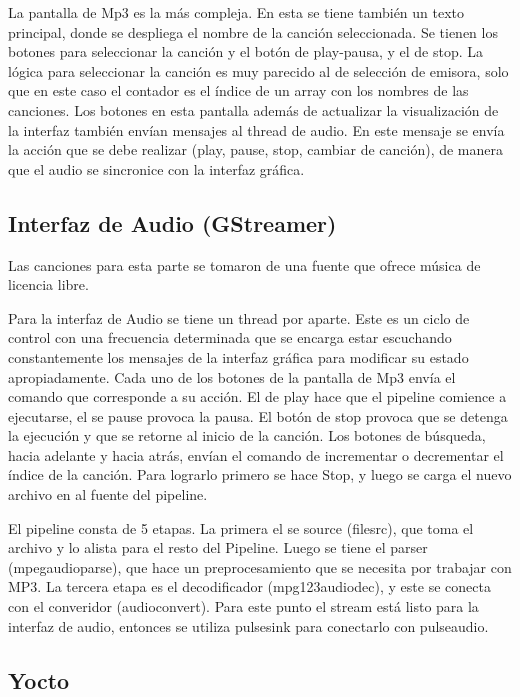La pantalla de Mp3 es la más compleja. En esta se tiene también un texto principal, donde se
despliega el nombre de la canción seleccionada. Se tienen los botones para seleccionar la canción y
el botón de play-pausa, y el de stop. La lógica para seleccionar la canción es muy parecido al de
selección de emisora, solo que en este caso el contador es el índice de un array con los nombres de
las canciones. Los botones en esta pantalla además de actualizar la visualización de la interfaz
también envían mensajes al thread de audio. En este mensaje se envía la acción que se debe realizar
(play, pause, stop, cambiar de canción), de manera que el audio se sincronice con la interfaz
gráfica. 

\subsection{Interfaz de Audio (GStreamer)}
\label{sec:gstramer}
Las canciones para esta parte se tomaron de una fuente que ofrece música de licencia libre. %


Para la interfaz de Audio se tiene un thread por aparte. Este es un ciclo de control con una
frecuencia determinada que se encarga estar escuchando constantemente los mensajes de la interfaz
gráfica para modificar su estado apropiadamente. Cada uno de los botones de la pantalla de Mp3 envía
el comando que corresponde a su acción. El de play hace que el pipeline comience a ejecutarse, el se
pause provoca la pausa. El botón de stop provoca que se detenga la ejecución y que se retorne al
inicio de la canción. Los botones de búsqueda, hacia adelante y hacia atrás, envían el comando de
incrementar o decrementar el índice de la canción. Para lograrlo primero se hace Stop, y luego se
carga el nuevo archivo en al fuente del pipeline. 

El pipeline consta de 5 etapas. La primera el se source (filesrc), que toma el archivo y lo alista
para el resto del Pipeline. Luego se tiene el parser (mpegaudioparse), que hace un preprocesamiento
que se necesita por trabajar con MP3. La tercera etapa es el decodificador (mpg123audiodec), y este
se conecta con el converidor (audioconvert). Para este punto el stream está listo para la interfaz
de audio, entonces se utiliza pulsesink para conectarlo con pulseaudio. 


\subsection{Yocto}
\label{sec:yocto}


